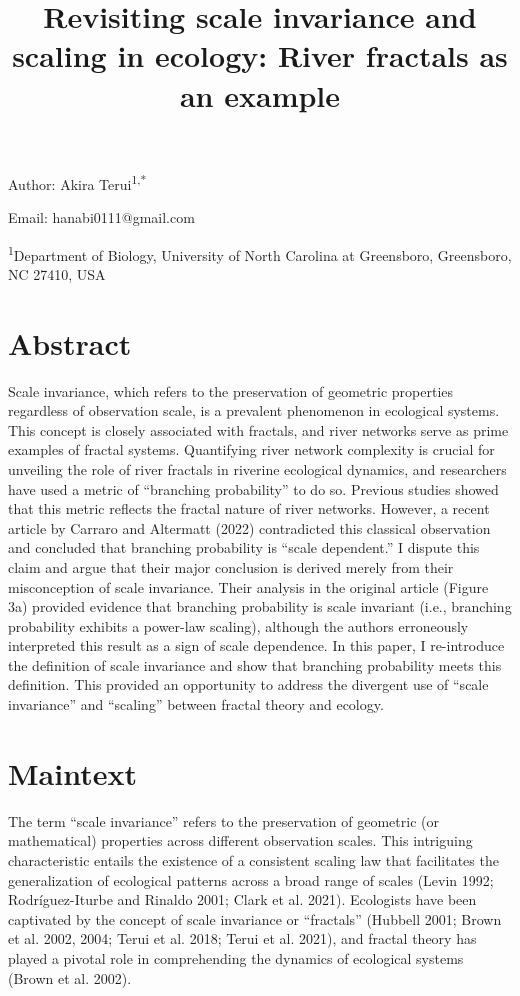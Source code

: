 \documentclass[
  12pt,
]{article}
\title{Revisiting scale invariance and scaling in ecology: River fractals as an example}
\author{}
\date{\vspace{-2.5em}}
\begin{document}
\maketitle

Author: Akira Terui\textsuperscript{1,*}

Email: hanabi0111@gmail.com

\textsuperscript{1}Department of Biology, University of North Carolina at Greensboro, Greensboro, NC 27410, USA

\hypertarget{abstract}{%
\section{Abstract}\label{abstract}}

Scale invariance, which refers to the preservation of geometric properties regardless of observation scale, is a prevalent phenomenon in ecological systems. This concept is closely associated with fractals, and river networks serve as prime examples of fractal systems. Quantifying river network complexity is crucial for unveiling the role of river fractals in riverine ecological dynamics, and researchers have used a metric of ``branching probability'' to do so. Previous studies showed that this metric reflects the fractal nature of river networks. However, a recent article by Carraro and Altermatt (2022) contradicted this classical observation and concluded that branching probability is ``scale dependent.'' I dispute this claim and argue that their major conclusion is derived merely from their misconception of scale invariance. Their analysis in the original article (Figure 3a) provided evidence that branching probability is scale invariant (i.e., branching probability exhibits a power-law scaling), although the authors erroneously interpreted this result as a sign of scale dependence. In this paper, I re-introduce the definition of scale invariance and show that branching probability meets this definition. This provided an opportunity to address the divergent use of ``scale invariance'' and ``scaling'' between fractal theory and ecology.

\hypertarget{maintext}{%
\section{Maintext}\label{maintext}}

The term ``scale invariance'' refers to the preservation of geometric (or mathematical) properties across different observation scales. This intriguing characteristic entails the existence of a consistent scaling law that facilitates the generalization of ecological patterns across a broad range of scales (Levin 1992; Rodríguez-Iturbe and Rinaldo 2001; Clark et al. 2021). Ecologists have been captivated by the concept of scale invariance or ``fractals'' (Hubbell 2001; Brown et al. 2002, 2004; Terui et al. 2018; Terui et al. 2021), and fractal theory has played a pivotal role in comprehending the dynamics of ecological systems (Brown et al. 2002).
\end{document}

